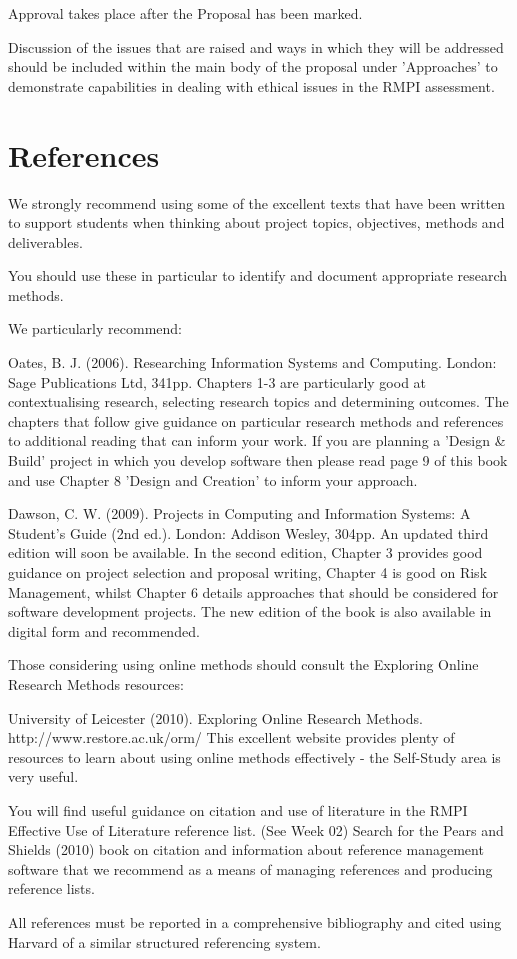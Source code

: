 Approval takes place after the Proposal has been marked.  

Discussion of the issues that are raised and ways in which they will be addressed should be included within the main body of the proposal under 'Approaches' to demonstrate capabilities in dealing with ethical issues in the RMPI assessment. 

\section*{References}
We strongly recommend using some of the excellent texts that have been written to support students when thinking about project topics, objectives, methods and deliverables.

You should use these in particular to identify and document appropriate research methods.

We particularly recommend:

Oates, B. J. (2006). Researching Information Systems and Computing. London: Sage Publications Ltd, 341pp.
Chapters 1-3 are particularly good at contextualising research, selecting research topics and determining outcomes. The chapters that follow give guidance on particular research methods and references to additional reading that can inform your work. If you are planning a 'Design \& Build' project in which you develop software then please read page 9 of this book and use Chapter 8 'Design and Creation' to inform your approach.

Dawson, C. W. (2009). Projects in Computing and Information Systems: A Student's Guide (2nd ed.). London: Addison Wesley, 304pp.
An updated third edition will soon be available. In the second edition, Chapter 3 provides good guidance on project selection and proposal writing, Chapter 4 is good on Risk Management, whilst Chapter 6 details approaches that should be considered for software development projects.
The new edition of the book is also available in digital form and recommended. 

Those considering using online methods should consult the Exploring Online Research Methods resources:

University of Leicester (2010). Exploring Online Research Methods. http://www.restore.ac.uk/orm/
This excellent website provides plenty of resources to learn about using online methods effectively - the Self-Study area is very useful.

You will find useful guidance on citation and use of literature in the RMPI Effective Use of Literature reference list. (See Week 02) Search for the Pears and Shields (2010) book on citation and information about reference management software that we recommend as a means of managing references and producing reference lists.

All references must be reported in a comprehensive bibliography and cited using Harvard of a similar structured referencing system.
